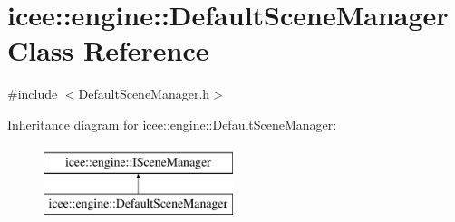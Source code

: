 \hypertarget{classicee_1_1engine_1_1DefaultSceneManager}{
\section{icee::engine::DefaultSceneManager Class Reference}
\label{classicee_1_1engine_1_1DefaultSceneManager}
}


{\ttfamily \#include $<$DefaultSceneManager.h$>$}

Inheritance diagram for icee::engine::DefaultSceneManager:\begin{figure}[H]
\begin{center}
\leavevmode
\includegraphics[height=2.000000cm]{classicee_1_1engine_1_1DefaultSceneManager}
\end{center}
\end{figure}
